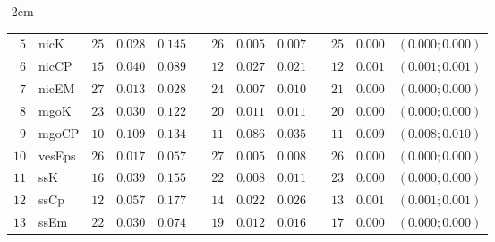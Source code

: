 \begin{table*}[!htbp]
\begin{adjustwidth*}{}{-2cm}
\begin{tabular}{@{}rlrrrrrrrrrcc@{}}
\footnotesize{$5 $} & \footnotesize{nicK     } & \footnotesize{$25$} & \footnotesize{$0.028$} & \footnotesize{$0.145$} && \footnotesize{$26$} & \footnotesize{$0.005$} & \footnotesize{$0.007$} && \footnotesize{$25$} & \footnotesize{$0.000$} & \footnotesize{$(0.000;0.000)$} \\
\footnotesize{$6 $} & \footnotesize{nicCP    } & \footnotesize{$15$} & \footnotesize{$0.040$} & \footnotesize{$0.089$} && \footnotesize{$12$} & \footnotesize{$0.027$} & \footnotesize{$0.021$} && \footnotesize{$12$} & \footnotesize{$0.001$} & \footnotesize{$(0.001;0.001)$} \\
\footnotesize{$7 $} & \footnotesize{nicEM    } & \footnotesize{$27$} & \footnotesize{$0.013$} & \footnotesize{$0.028$} && \footnotesize{$24$} & \footnotesize{$0.007$} & \footnotesize{$0.010$} && \footnotesize{$21$} & \footnotesize{$0.000$} & \footnotesize{$(0.000;0.000)$} \\
\footnotesize{$8 $} & \footnotesize{mgoK     } & \footnotesize{$23$} & \footnotesize{$0.030$} & \footnotesize{$0.122$} && \footnotesize{$20$} & \footnotesize{$0.011$} & \footnotesize{$0.011$} && \footnotesize{$20$} & \footnotesize{$0.000$} & \footnotesize{$(0.000;0.000)$} \\
\footnotesize{$9 $} & \footnotesize{mgoCP    } & \footnotesize{$10$} & \footnotesize{$0.109$} & \footnotesize{$0.134$} && \footnotesize{$11$} & \footnotesize{$0.086$} & \footnotesize{$0.035$} && \footnotesize{$11$} & \footnotesize{$0.009$} & \footnotesize{$(0.008;0.010)$} \\
\footnotesize{$10$} & \footnotesize{vesEps   } & \footnotesize{$26$} & \footnotesize{$0.017$} & \footnotesize{$0.057$} && \footnotesize{$27$} & \footnotesize{$0.005$} & \footnotesize{$0.008$} && \footnotesize{$26$} & \footnotesize{$0.000$} & \footnotesize{$(0.000;0.000)$} \\
\footnotesize{$11$} & \footnotesize{ssK      } & \footnotesize{$16$} & \footnotesize{$0.039$} & \footnotesize{$0.155$} && \footnotesize{$22$} & \footnotesize{$0.008$} & \footnotesize{$0.011$} && \footnotesize{$23$} & \footnotesize{$0.000$} & \footnotesize{$(0.000;0.000)$} \\
\footnotesize{$12$} & \footnotesize{ssCp     } & \footnotesize{$12$} & \footnotesize{$0.057$} & \footnotesize{$0.177$} && \footnotesize{$14$} & \footnotesize{$0.022$} & \footnotesize{$0.026$} && \footnotesize{$13$} & \footnotesize{$0.001$} & \footnotesize{$(0.001;0.001)$} \\
\footnotesize{$13$} & \footnotesize{ssEm     } & \footnotesize{$22$} & \footnotesize{$0.030$} & \footnotesize{$0.074$} && \footnotesize{$19$} & \footnotesize{$0.012$} & \footnotesize{$0.016$} && \footnotesize{$17$} & \footnotesize{$0.000$} & \footnotesize{$(0.000;0.000)$} \\

\end{tabular}
\end{adjustwidth*}
\end{table*}
